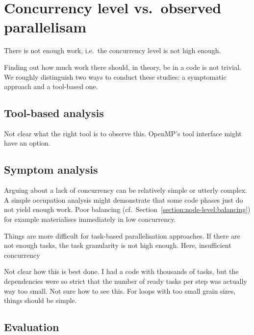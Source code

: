 \section{Concurrency level vs.~observed parallelisam}
\label{section:node-level:concurrency}

\begin{hypothesis}
 There is not enough work, i.e.~the concurrency level is not high enough.
\end{hypothesis}

Finding out how much work there should, in theory, be in a code is not trivial.
We roughly distinguish two ways to conduct these studies:
a symptomatic approach and a tool-based one.


\subsection{Tool-based analysis}

\begin{wip}
 Not clear what the right tool is to observe this. OpenMP's tool interface might have an option.
\end{wip}


\subsection{Symptom analysis}

Arguing about a lack of concurrency can be relatively simple or utterly complex.
A simple occupation analysis might demonstrate that some code phases just do not yield enough work.
Poor balancing (cf.~Section~\ref{section:node-level:balancing}) for example materialises immediately in low concurrency.


Things are more difficult for task-based parallelisation approaches.
If there are not enough tasks, the task granularity is not high enough.
Here, insufficient concurrency 


\begin{wip}
 Not clear how this is best done. I had a code with thousands of tasks, but the dependencies were so strict that the number of ready tasks per step was actually way too small.
 Not sure how to see this. 
 For loops with too small grain sizes, things should be simple.
\end{wip}




\subsection{Evaluation}



